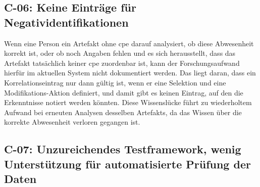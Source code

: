 \subsection{C-06: Keine Einträge für Negatividentifikationen}\label{subsec:c-06-falle-ohne-aktion-konnen-nicht-dokumentiert-werden}


Wenn eine Person ein Artefakt ohne \acrshort{cpe} darauf analysiert, ob diese Abwesenheit korrekt ist, oder ob noch Angaben fehlen und es sich herausstellt, dass das Artefakt tatsächlich keiner \acrshort{cpe} zuordenbar ist, kann der Forschungsaufwand hierfür im aktuellen System nicht dokumentiert werden.
Das liegt daran, dass ein Korrelationseintrag nur dann gültig ist, wenn er eine Selektion und eine Modifikations-Aktion definiert, und damit gibt es keinen Eintrag, auf den die Erkenntnisse notiert werden könnten.
Diese Wissenslücke führt zu wiederholtem Aufwand bei erneuten Analysen desselben Artefakts, da das Wissen über die korrekte Abwesenheit verloren gegangen ist.

\subsection{C-07: Unzureichendes Testframework, wenig Unterstützung für automatisierte Prüfung der Daten}\label{subsec:c-07-test-framework}


